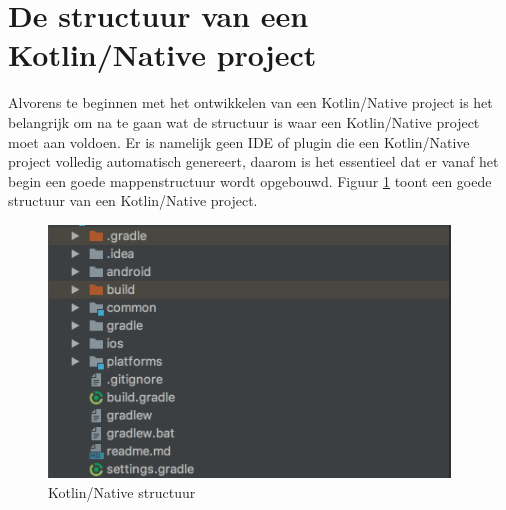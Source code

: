 \section{De structuur van een Kotlin/Native project}
\label{sec:knstructure}
Alvorens te beginnen met het ontwikkelen van een Kotlin/Native project is het belangrijk om na te gaan wat de structuur is waar een Kotlin/Native project moet aan voldoen. Er is namelijk geen IDE of plugin die een Kotlin/Native project volledig automatisch genereert, daarom is het essentieel dat er vanaf het begin een goede mappenstructuur wordt opgebouwd. Figuur \ref{fig:knstructuur} toont een goede structuur van een Kotlin/Native project.

\begin{figure} [ht]
	\centering
	\includegraphics[width=0.95\textwidth]{img/kn-project-structure}
	\caption{Kotlin/Native structuur}
	\label{fig:knstructuur}
\end{figure}

